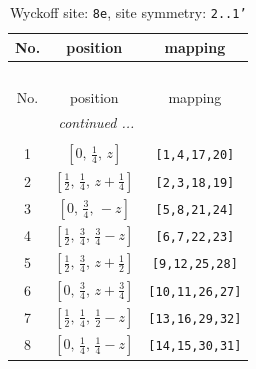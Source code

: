 \documentclass[fleqn,8pt]{jsarticle}
\begin{document}
\begin{longtable}{ccc}
\caption{Wyckoff site: {\tt 8e}, site symmetry: {\tt 2..1'}}
 \\
 \hline \hline
No. & position & mapping \\ \hline \endfirsthead

\multicolumn{2}{l}{\tablename\ \thetable{}} \\
 \hline \hline
No. & position & mapping \\ \hline \endhead

 \hline \hline
\multicolumn{2}{r}{\footnotesize\it continued ...} \\ \endfoot

 \hline \hline
\multicolumn{2}{r}{} \\ \endlastfoot

1 & $\left[ 0,\, \frac{1}{4},\, z \right]$ & {\tt [1,4,17,20]} \\ \hline
2 & $\left[ \frac{1}{2},\, \frac{1}{4},\, z + \frac{1}{4} \right]$ & {\tt [2,3,18,19]} \\ \hline
3 & $\left[ 0,\, \frac{3}{4},\, - z \right]$ & {\tt [5,8,21,24]} \\ \hline
4 & $\left[ \frac{1}{2},\, \frac{3}{4},\, \frac{3}{4} - z \right]$ & {\tt [6,7,22,23]} \\ \hline
5 & $\left[ \frac{1}{2},\, \frac{3}{4},\, z + \frac{1}{2} \right]$ & {\tt [9,12,25,28]} \\ \hline
6 & $\left[ 0,\, \frac{3}{4},\, z + \frac{3}{4} \right]$ & {\tt [10,11,26,27]} \\ \hline
7 & $\left[ \frac{1}{2},\, \frac{1}{4},\, \frac{1}{2} - z \right]$ & {\tt [13,16,29,32]} \\ \hline
8 & $\left[ 0,\, \frac{1}{4},\, \frac{1}{4} - z \right]$ & {\tt [14,15,30,31]} \\
\end{longtable}
\renewcommand{\arraystretch}{1.2}
\end{document}
